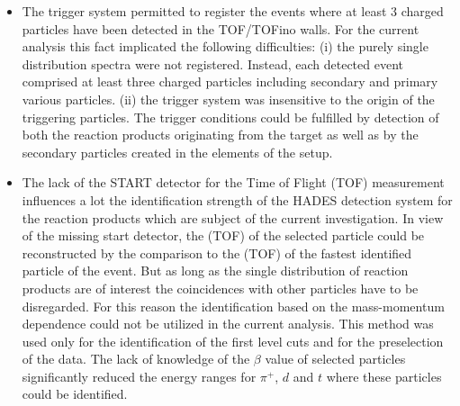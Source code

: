 \begin{itemize}
	\item The trigger system permitted to register the events where at least 3 charged particles have been detected in the TOF/TOFino walls. For the current analysis this fact implicated the following difficulties:
	(i) the purely single distribution spectra were not registered. Instead, each detected event comprised at least three charged particles including secondary and primary various particles.
	(ii) the trigger system was insensitive to the origin of the triggering particles. The trigger conditions could be fulfilled by detection of both the reaction products originating from the target as well as by the secondary particles created in the elements of the setup.
	\item The lack of the START detector for the Time of Flight (TOF) measurement influences a lot the identification strength of the HADES detection system for the reaction products which are subject of the current investigation. In view of the missing start detector, the (TOF) of the selected particle could be reconstructed by the comparison to the (TOF) of the fastest identified particle of the event. But as long as the single distribution of reaction products are of interest the coincidences with other particles have to be disregarded. For this reason the identification 
	based on the mass-momentum dependence could not be utilized in the current analysis. 
	This method was used only for the identification of the first level cuts and for the preselection of the data.
	The lack of knowledge of the $\beta$ value of selected particles significantly reduced the energy ranges for $\pi{^+}$, $d$ and $t$ where these particles could be identified. 
\end{itemize}
